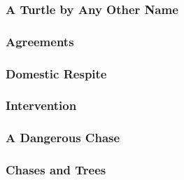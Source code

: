        \subsubsection{A Turtle by Any Other Name}
        \subsubsection{Agreements}
        \subsubsection{Domestic Respite}
        \subsubsection{Intervention}
        \subsubsection{A Dangerous Chase}
        \subsubsection{Chases and Trees}